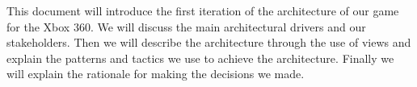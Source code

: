 This document will introduce the first iteration of the architecture of our
game for the Xbox 360.  We will discuss the main architectural drivers and our
stakeholders.  Then we will describe the architecture through the use of views
and explain the patterns and tactics we use to achieve the architecture.  
Finally we will explain the rationale for making the decisions we made.
